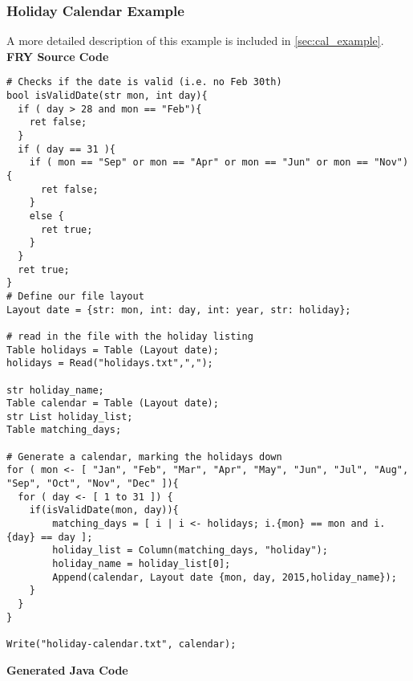\documentclass{article}
\begin{document}
\subsubsection{Holiday Calendar Example}
A more detailed description of this example is included in \ref{sec:cal_example}.
\textbf{FRY Source Code}
\begin{lstlisting}
# Checks if the date is valid (i.e. no Feb 30th)
bool isValidDate(str mon, int day){
  if ( day > 28 and mon == "Feb"){
    ret false;
  }
  if ( day == 31 ){
    if ( mon == "Sep" or mon == "Apr" or mon == "Jun" or mon == "Nov"){
      ret false;
    }
    else {
      ret true;
    }
  }
  ret true;
}
# Define our file layout
Layout date = {str: mon, int: day, int: year, str: holiday};

# read in the file with the holiday listing
Table holidays = Table (Layout date);
holidays = Read("holidays.txt",",");

str holiday_name;
Table calendar = Table (Layout date);
str List holiday_list;
Table matching_days;

# Generate a calendar, marking the holidays down
for ( mon <- [ "Jan", "Feb", "Mar", "Apr", "May", "Jun", "Jul", "Aug", "Sep", "Oct", "Nov", "Dec" ]){
  for ( day <- [ 1 to 31 ]) {
    if(isValidDate(mon, day)){
        matching_days = [ i | i <- holidays; i.{mon} == mon and i.{day} == day ];
        holiday_list = Column(matching_days, "holiday");
        holiday_name = holiday_list[0];
        Append(calendar, Layout date {mon, day, 2015,holiday_name});
    }
  }
}

Write("holiday-calendar.txt", calendar);
\end{lstlisting}
\vspace{5mm}
\textbf{Generated Java Code}
\end{document}
